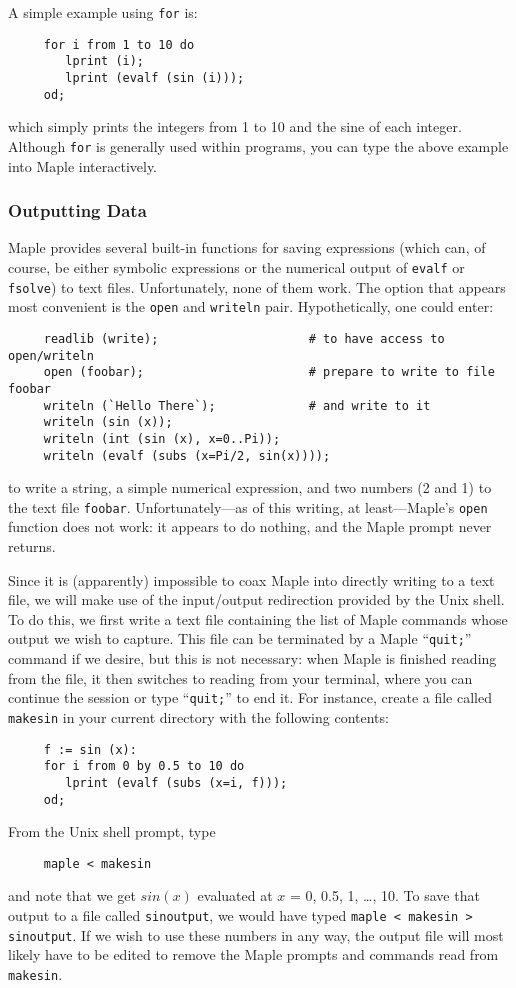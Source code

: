 \documentclass[11pt]{article}
\begin{document}
A simple example using \verb|for| is:
\begin{verbatim}
     for i from 1 to 10 do
        lprint (i);
        lprint (evalf (sin (i)));
     od;
\end{verbatim}
which simply prints the integers from 1 to 10 and the sine of each
integer.  Although \verb|for| is generally used within programs, you
can type the above example into Maple interactively.


\subsubsection{Outputting Data}

Maple provides several built-in functions for saving expressions
(which can, of course, be either symbolic expressions or the numerical
output of \verb|evalf| or \verb|fsolve|) to text files.
Unfortunately, none of them work.  The option that appears most
convenient is the \verb|open| and \verb|writeln| pair.
Hypothetically, one could enter:
\begin{verbatim}
     readlib (write);                     # to have access to open/writeln
     open (foobar);                       # prepare to write to file foobar
     writeln (`Hello There`);             # and write to it
     writeln (sin (x));
     writeln (int (sin (x), x=0..Pi));
     writeln (evalf (subs (x=Pi/2, sin(x))));
\end{verbatim}
to write a string, a simple numerical expression, and two numbers (2
and 1) to the text file \verb|foobar|.  Unfortunately---as of this
writing, at least---Maple's \verb|open| function does not work: it 
appears to do nothing, and the Maple prompt never returns.

Since it is (apparently) impossible to coax Maple into directly
writing to a text file, we will make use of the input/output
redirection provided by the Unix shell.  To do this, we first write a
text file containing the list of Maple commands whose output we wish
to capture.  This file can be terminated by a Maple ``\verb|quit;|''
command if we desire, but this is not necessary: when Maple is
finished reading from the file, it then switches to reading from your
terminal, where you can continue the session or type ``\verb|quit;|'' to
end it.  For instance, create a file called \verb|makesin| in your
current directory with the following contents:
\begin{verbatim}
     f := sin (x):
     for i from 0 by 0.5 to 10 do
        lprint (evalf (subs (x=i, f)));
     od;
\end{verbatim}
From the Unix shell prompt, type
\begin{verbatim}
     maple < makesin
\end{verbatim}
and note that we get $sin(x)$ evaluated at $x$ = 0, 0.5, 1, \ldots, 10.  To
save that output to a file called \verb|sinoutput|, we would have
typed \verb|maple < makesin > sinoutput|.  If we wish to use these
numbers in any way, the output file will most likely have to be edited
to remove the Maple prompts and commands read from \verb|makesin|.
\end{document}
